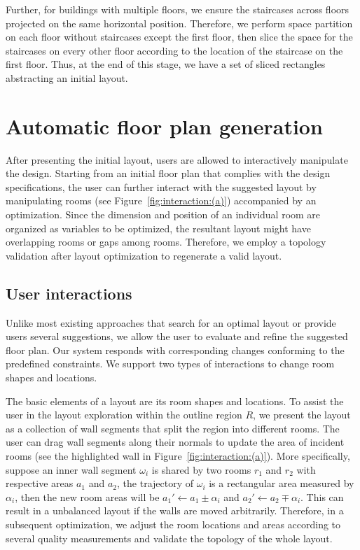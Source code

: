 Further, for buildings with multiple floors, we ensure the staircases across floors projected on the same horizontal position. Therefore, we perform space partition on each floor without staircases except the first floor, then slice the space for the staircases on every other floor according to the location of the staircase on the first floor. Thus, at the end of this stage, we have a set of sliced rectangles abstracting an initial layout.

\section{Automatic floor plan generation}

After presenting the initial layout, users are allowed to interactively manipulate the design. Starting from an initial floor plan that complies with the design specifications, the user can further interact with the suggested layout by manipulating rooms (see Figure~\ref{fig:interaction:(a)}) accompanied by an optimization. Since the dimension and position of an individual room are organized as variables to be optimized, the resultant layout might have overlapping rooms or gaps among rooms. Therefore, we employ a topology validation after layout optimization to regenerate a valid layout.

\subsection{User interactions}

Unlike most existing approaches that search for an optimal layout or provide users several suggestions, we allow the user to evaluate and refine the suggested floor plan. Our system responds with corresponding changes conforming to the predefined constraints. We support two types of interactions to change room shapes and locations.

The basic elements of a layout are its room shapes and locations. To assist the user in the layout exploration within the outline region $R$, we present the layout as a collection of wall segments that split the region into different rooms. The user can drag wall segments along their normals to update the area of incident rooms (see the highlighted wall in Figure~\ref{fig:interaction:(a)}). More specifically, suppose an inner wall segment $\omega_i$ is shared by two rooms $r_1$ and $r_2$ with respective areas $a_1$ and $a_2$, the trajectory of $\omega_i$ is a rectangular area measured by $\alpha_i$, then the new room areas will be $a_1' \leftarrow a_1 \pm \alpha_i$ and $a_2' \leftarrow a_2 \mp \alpha_i$. This can result in a unbalanced layout if the walls are moved arbitrarily. Therefore, in a subsequent optimization, we adjust the room locations and areas according to several quality measurements and validate the topology of the whole layout.

